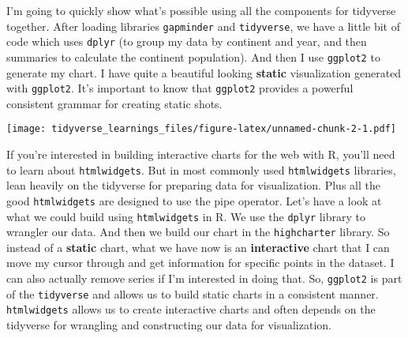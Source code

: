 \documentclass[
]{article}
\newenvironment{Shaded}{\begin{snugshade}}{\end{snugshade}}
\newcommand{\AttributeTok}[1]{\textcolor[rgb]{0.77,0.63,0.00}{#1}}
\newcommand{\FunctionTok}[1]{\textcolor[rgb]{0.00,0.00,0.00}{#1}}
\newcommand{\NormalTok}[1]{#1}
\newcommand{\SpecialCharTok}[1]{\textcolor[rgb]{0.00,0.00,0.00}{#1}}
\newcommand{\StringTok}[1]{\textcolor[rgb]{0.31,0.60,0.02}{#1}}
\begin{document}
I'm going to quickly show what's possible using all the components for tidyverse together. After loading libraries \texttt{gapminder} and \texttt{tidyverse}, we have a little bit of code which uses \texttt{dplyr} (to group my data by continent and year, and then summaries to calculate the continent population). And then I use \texttt{ggplot2} to generate my chart. I have quite a beautiful looking \textbf{static} visualization generated with \texttt{ggplot2}. It's important to know that \texttt{ggplot2} provides a powerful consistent grammar for creating static shots.

\begin{Shaded}
\end{Shaded}

\texttt{[image: tidyverse\_learnings\_files/figure-latex/unnamed-chunk-2-1.pdf]}

If you're interested in building interactive charts for the web with R, you'll need to learn about \texttt{htmlwidgets}. But in most commonly used \texttt{htmlwidgets} libraries, lean heavily on the tidyverse for preparing data for visualization. Plus all the good \texttt{htmlwidgets} are designed to use the pipe operator. Let's have a look at what we could build using \texttt{htmlwidgets} in R. We use the \texttt{dplyr} library to wrangler our data. And then we build our chart in the \texttt{highcharter} library. So instead of a \textbf{static} chart, what we have now is an \textbf{interactive} chart that I can move my cursor through and get information for specific points in the dataset. I can also actually remove series if I'm interested in doing that. So, \texttt{ggplot2} is part of the \texttt{tidyverse} and allows us to build static charts in a consistent manner. \texttt{htmlwidgets} allows us to create interactive charts and often depends on the tidyverse for wrangling and constructing our data for visualization.
\end{document}
